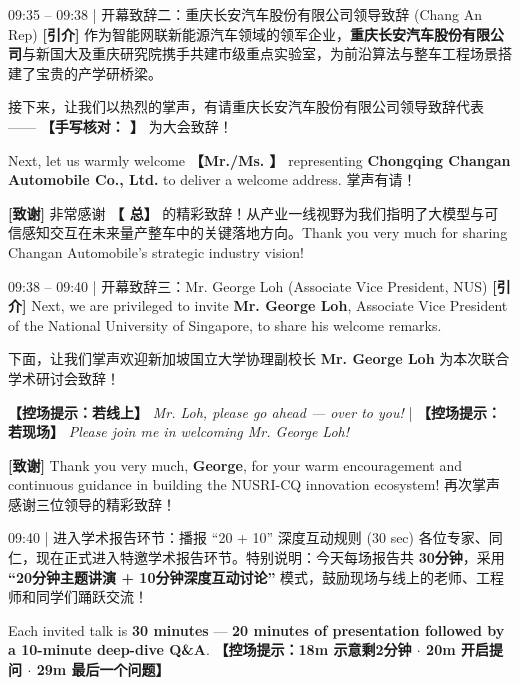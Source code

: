 \documentclass[12pt,a4paper]{article}
\newcommand{\cue}[1]{%
  {\fontsize{9.6}{12.5}\selectfont\textcolor{nusorange}{\textbf{【控场提示：#1】}}}%
}
\newcommand{\blankline}[1]{%
  \underline{\hspace{#1}}%
}
\begin{document}
\begin{scriptbox}{09:35 – 09:38 \;|\; 开幕致辞二：重庆长安汽车股份有限公司领导致辞 (Chang An Rep)}
\fontsize{11.6}{16.8}\selectfont
\textbf{[引介]} 作为智能网联新能源汽车领域的领军企业，\textbf{重庆长安汽车股份有限公司}与新国大及重庆研究院携手共建市级重点实验室，为前沿算法与整车工程场景搭建了宝贵的产学研桥梁。\par
接下来，让我们以热烈的掌声，有请重庆长安汽车股份有限公司领导致辞代表 —— \textbf{【手写核对：\blankline{64mm}】} 为大会致辞！\par
Next, let us warmly welcome \textbf{【Mr./Ms. \blankline{38mm}】} representing \textbf{Chongqing Changan Automobile Co., Ltd.} to deliver a welcome address. 掌声有请！\par
\vspace{1mm}
\textbf{[致谢]} 非常感谢 \textbf{【\blankline{18mm}总】} 的精彩致辞！从产业一线视野为我们指明了大模型与可信感知交互在未来量产整车中的关键落地方向。Thank you very much for sharing Changan Automobile's strategic industry vision!
\end{scriptbox}

\begin{scriptbox}{09:38 – 09:40 \;|\; 开幕致辞三：Mr. George Loh (Associate Vice President, NUS)}
\fontsize{11.6}{16.8}\selectfont
\textbf{[引介]} Next, we are privileged to invite \textbf{Mr. George Loh}, Associate Vice President of the National University of Singapore, to share his welcome remarks.\par
下面，让我们掌声欢迎新加坡国立大学协理副校长 \textbf{Mr. George Loh} 为本次联合学术研讨会致辞！\par
\cue{若线上} \textit{Mr. Loh, please go ahead — over to you!} \;|\; \cue{若现场} \textit{Please join me in welcoming Mr. George Loh!}\par
\vspace{1mm}
\textbf{[致谢]} Thank you very much, \textbf{George}, for your warm encouragement and continuous guidance in building the NUSRI-CQ innovation ecosystem! 再次掌声感谢三位领导的精彩致辞！
\end{scriptbox}

\begin{transbox}{09:40 \;|\; 进入学术报告环节：播报 “20 + 10” 深度互动规则 (30 sec)}
\fontsize{11.2}{16}\selectfont
各位专家、同仁，现在正式进入特邀学术报告环节。特别说明：今天每场报告共 \textbf{30分钟}，采用 \textbf{“20分钟主题讲演 + 10分钟深度互动讨论”} 模式，鼓励现场与线上的老师、工程师和同学们踊跃交流！\par
Each invited talk is \textbf{30 minutes} — \textbf{20 minutes of presentation followed by a 10-minute deep-dive Q\&A}. \cue{18m 示意剩2分钟 $\cdot$ 20m 开启提问 $\cdot$ 29m 最后一个问题}
\end{transbox}
\end{document}
